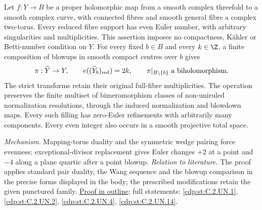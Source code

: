 \hypertarget{main-II-D}{}
\begin{maintheorem}
\hypertarget{tag-03K5}{}\label{series:II:D}

Let $f:Y\to B$ be a proper holomorphic map from a smooth complex
threefold to a smooth complex curve, with connected fibres and
smooth general fibre a complex two-torus. Every reduced fibre
support has even Euler number, with arbitrary singularities and
multiplicities. This assertion imposes no compactness, K\"ahler
or Betti-number condition on $Y$.
For every fixed $b\in B$ and every $k\in\Z$, a finite composition
of blowups in smooth compact centres over $b$ gives
\[
 \pi:\widetilde Y\to Y,
 \qquad e((\widetilde Y_b)_{\rm red})=2k,
 \qquad \pi|_{B\setminus\{b\}}\text{ a biholomorphism}.
\]
The strict transforms retain their original full-fibre
multiplicities. The operation preserves the finite multiset of
bimeromorphism classes of non-uniruled normalization resolutions,
through the induced normalization and blowdown maps. Every such
filling has zero-Euler refinements with arbitrarily many components.
Every even integer also occurs in a smooth projective total space.

\end{maintheorem}

\textit{Mechanism.} Mapping-torus duality and the symmetric wedge
pairing force evenness; exceptional-divisor replacement gives Euler
changes $+2$ at a point and $-4$ along a plane quartic after a point
blowup.
\textit{Relation to literature.} The proof applies standard pair
duality, the Wang sequence and the blowup comparison in the precise
forms displayed in the body; the prescribed modifications retain
the given punctured family.
\hyperlink{outline-II-D}{Proof in outline}; full statements:
\ref{cdp:st:C.2.UN.1}, \ref{cdp:st:C.2.UN.2},
\ref{cdp:st:C.2.UN.4}, \ref{cdp:st:C.2.UN.14}.

